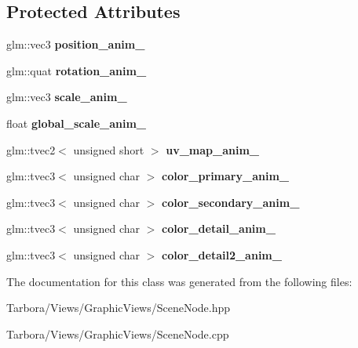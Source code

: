 \subsection*{Protected Attributes}
\begin{DoxyCompactItemize}
\item 
\mbox{\label{classTarbora_1_1AnimatedNode_a02fc79ea76ea1a7b2a5c34c92e215716}} 
glm\+::vec3 {\bfseries position\+\_\+anim\+\_\+}
\item 
\mbox{\label{classTarbora_1_1AnimatedNode_ace8df245f00cf87a48a9f25508415589}} 
glm\+::quat {\bfseries rotation\+\_\+anim\+\_\+}
\item 
\mbox{\label{classTarbora_1_1AnimatedNode_a951070a55a9c75da3af2d6ae10f8c3ed}} 
glm\+::vec3 {\bfseries scale\+\_\+anim\+\_\+}
\item 
\mbox{\label{classTarbora_1_1AnimatedNode_a7941318652eed31b40cc44c5927c65e8}} 
float {\bfseries global\+\_\+scale\+\_\+anim\+\_\+}
\item 
\mbox{\label{classTarbora_1_1AnimatedNode_a03c3d13efeb19eee3cb774fafc77f62e}} 
glm\+::tvec2$<$ unsigned short $>$ {\bfseries uv\+\_\+map\+\_\+anim\+\_\+}
\item 
\mbox{\label{classTarbora_1_1AnimatedNode_a5afaff7507ededc5f6cfb4ffef6b7d41}} 
glm\+::tvec3$<$ unsigned char $>$ {\bfseries color\+\_\+primary\+\_\+anim\+\_\+}
\item 
\mbox{\label{classTarbora_1_1AnimatedNode_a594393a8878b86938f3552c1515cf7f7}} 
glm\+::tvec3$<$ unsigned char $>$ {\bfseries color\+\_\+secondary\+\_\+anim\+\_\+}
\item 
\mbox{\label{classTarbora_1_1AnimatedNode_a93916433f3bc22b7817a51b9a9ff5161}} 
glm\+::tvec3$<$ unsigned char $>$ {\bfseries color\+\_\+detail\+\_\+anim\+\_\+}
\item 
\mbox{\label{classTarbora_1_1AnimatedNode_a3b2b12634b95c0d9008dda3a1a96e666}} 
glm\+::tvec3$<$ unsigned char $>$ {\bfseries color\+\_\+detail2\+\_\+anim\+\_\+}
\end{DoxyCompactItemize}


The documentation for this class was generated from the following files\+:\begin{DoxyCompactItemize}
\item 
Tarbora/\+Views/\+Graphic\+Views/Scene\+Node.\+hpp\item 
Tarbora/\+Views/\+Graphic\+Views/Scene\+Node.\+cpp\end{DoxyCompactItemize}
